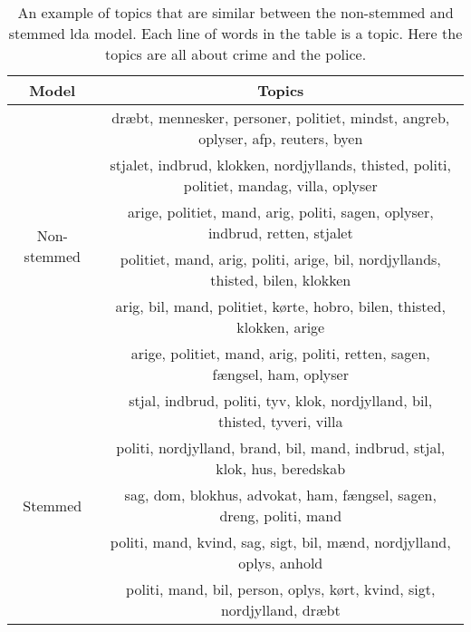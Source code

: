 \begin{table}
	\caption{An example of topics that are similar between the non-stemmed and stemmed \gls{lda} model.
		Each line of words in the table is a topic.
		Here the topics are all about crime and the police.}
	\label{tab:topic_examples}
	\centering
	\begin{tabular}{c|c}
		Model & Topics \\
		\midrule
		\multirow{6}{*}{Non-stemmed} & dræbt, mennesker, personer, politiet, mindst, angreb, oplyser, afp, reuters, byen  \\
		 & stjalet, indbrud, klokken, nordjyllands, thisted, politi, politiet, mandag, villa, oplyser  \\
		 & arige, politiet, mand, arig, politi, sagen, oplyser, indbrud, retten, stjalet  \\
		 & politiet, mand, arig, politi, arige, bil, nordjyllands, thisted, bilen, klokken  \\
		 & arig, bil, mand, politiet, kørte, hobro, bilen, thisted, klokken, arige  \\
		 & arige, politiet, mand, arig, politi, retten, sagen, fængsel, ham, oplyser  \\
		\midrule
		\multirow{5}{*}{Stemmed} & stjal, indbrud, politi, tyv, klok, nordjylland, bil, thisted, tyveri, villa  \\
		 & politi, nordjylland, brand, bil, mand, indbrud, stjal, klok, hus, beredskab  \\
		 & sag, dom, blokhus, advokat, ham, fængsel, sagen, dreng, politi, mand  \\
		 & politi, mand, kvind, sag, sigt, bil, mænd, nordjylland, oplys, anhold  \\
		 & politi, mand, bil, person, oplys, kørt, kvind, sigt, nordjylland, dræbt  \\
	\end{tabular}
\end{table}
